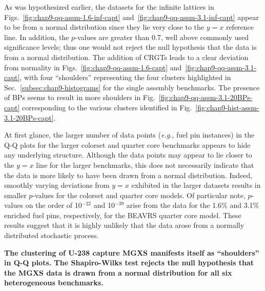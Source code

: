 As was hypothesized earlier, the datasets for the infinite lattices in Figs.~\ref{fig:chap9-qq-assm-1.6-inf-capt} and~\ref{fig:chap9-qq-assm-3.1-inf-capt} appear to be from a normal distribution since they lie very close to the $y = x$ reference line. In addition, the $p$-values are greater than 0.7, well above commonly used significance levels; thus one would not reject the null hypothesis that the data is from a normal distribution. The addition of \acp{CRGT} leads to a clear deviation from normality in Figs.~\ref{fig:chap9-qq-assm-1.6-capt} and~\ref{fig:chap9-qq-assm-3.1-capt}, with four ``shoulders'' representing the four clusters highlighted in Sec.~\ref{subsec:chap9-histograms} for the single assembly benchmarks. The presence of \acp{BP} seems to result in more shoulders in Fig.~\ref{fig:chap9-qq-assm-3.1-20BPs-capt} corresponding to the various clusters identified in Fig.~\ref{fig:chap9-hist-assm-3.1-20BPs-capt}. 

At first glance, the larger number of data points (\textit{e.g.}, fuel pin instances) in the \ac{Q-Q} plots for the larger colorset and quarter core benchmarks appears to hide any underlying structure. Although the data points may appear to lie closer to the $y = x$ line for the larger benchmarks, this does not necessarily indicate that the data is more likely to have been drawn from a normal distribution. Indeed, smoothly varying deviations from $y = x$ exhibited in the larger datasets results in smaller $p$-values for the colorset and quarter core models. Of particular note, $p$-values on the order of 10$^{-22}$ and 10$^{-39}$ arise from the data for the 1.6\% and 3.1\% enriched fuel pins, respectively, for the \ac{BEAVRS} quarter core model. These results suggest that it is highly unlikely that the data arose from a normally distributed stochastic process.


\begin{emphbox}
\textbf{The clustering of U-238 capture \ac{MGXS} manifests itself as ``shoulders'' in \ac{Q-Q} plots. The Shapiro-Wilks test rejects the null hypothesis that the \ac{MGXS} data is drawn from a normal distribution for all six heterogeneous benchmarks.}
\end{emphbox}


